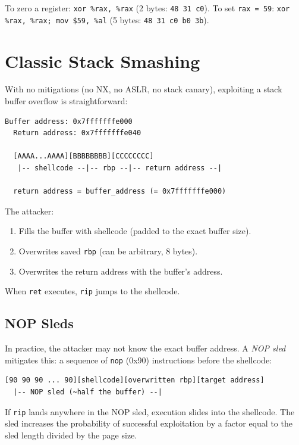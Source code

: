 \begin{example}
	To zero a register: \texttt{xor \%rax, \%rax} (2 bytes: \texttt{48 31 c0}). To set \texttt{rax = 59}: \texttt{xor \%rax, \%rax; mov \$59, \%al} (5 bytes: \texttt{48 31 c0 b0 3b}).
\end{example}

\section{Classic Stack Smashing}

With no mitigations (no NX, no ASLR, no stack canary), exploiting a stack buffer overflow is straightforward:

\begin{lstlisting}[caption=Classic exploitation layout]
  Buffer address: 0x7fffffffe000
  Return address: 0x7fffffffe040

  [AAAA...AAAA][BBBBBBBB][CCCCCCCC]
   |-- shellcode --|-- rbp --|-- return address --|

  return address = buffer_address (= 0x7fffffffe000)
\end{lstlisting}

The attacker:
\begin{enumerate}
	\item Fills the buffer with shellcode (padded to the exact buffer size).
	\item Overwrites saved \texttt{rbp} (can be arbitrary, 8 bytes).
	\item Overwrites the return address with the buffer's address.
\end{enumerate}

When \texttt{ret} executes, \texttt{rip} jumps to the shellcode.

\subsection{NOP Sleds}

In practice, the attacker may not know the exact buffer address. A \emph{NOP sled} mitigates this: a sequence of \texttt{nop} (0x90) instructions before the shellcode:

\begin{lstlisting}[caption=NOP sled]
  [90 90 90 ... 90][shellcode][overwritten rbp][target address]
  |-- NOP sled (~half the buffer) --|
\end{lstlisting}

If \texttt{rip} lands anywhere in the NOP sled, execution slides into the shellcode. The sled increases the probability of successful exploitation by a factor equal to the sled length divided by the page size.

